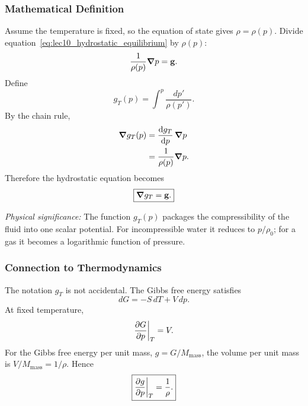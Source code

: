 \documentclass[../main.tex]{subfiles}
\begin{document}
\subsubsection*{Mathematical Definition}
Assume the temperature is fixed, so the equation of state gives $\rho=\rho(p)$. Divide equation~\eqref{eq:lec10_hydrostatic_equilibrium} by $\rho(p)$:
\begin{equation}
  \frac{1}{\rho(p)}\grad p=\mathbf{g}.
  \label{eq:lec10_divide_by_density}
\end{equation}
Define
\begin{equation}
  \boxed{
  g_T(p)=\int^p \frac{dp'}{\rho(p')}.}
  \label{eq:lec10_gibbs_per_mass_definition}
\end{equation}
By the chain rule,
\begin{align}
  \grad g_T(p)
  &=
  \dv{g_T}{p}\,\grad p
  \label{eq:lec10_chain_rule_gibbs_1}\\
  &=
  \frac{1}{\rho(p)}\grad p.
  \label{eq:lec10_chain_rule_gibbs_2}
\end{align}
Therefore the hydrostatic equation becomes
\begin{equation}
  \boxed{\grad g_T=\mathbf{g}.}
  \label{eq:lec10_grad_gibbs_equals_g}
\end{equation}

\textit{Physical significance:} The function $g_T(p)$ packages the compressibility of the fluid into one scalar potential. For incompressible water it reduces to $p/\rho_0$; for a gas it becomes a logarithmic function of pressure.

\subsubsection*{Connection to Thermodynamics}
The notation $g_T$ is not accidental. The Gibbs free energy satisfies
\begin{equation}
  dG=-S\,dT+V\,dp.
  \label{eq:lec10_gibbs_differential}
\end{equation}
At fixed temperature,
\begin{equation}
  \pdv{G}{p}\bigg|_T=V.
  \label{eq:lec10_dGdp_volume}
\end{equation}
For the Gibbs free energy per unit mass, $g=G/M_{\mathrm{mass}}$, the volume per unit mass is $V/M_{\mathrm{mass}}=1/\rho$. Hence
\begin{equation}
  \boxed{\pdv{g}{p}\bigg|_T=\frac{1}{\rho}.}
  \label{eq:lec10_specific_gibbs_derivative}
\end{equation}
\end{document}
